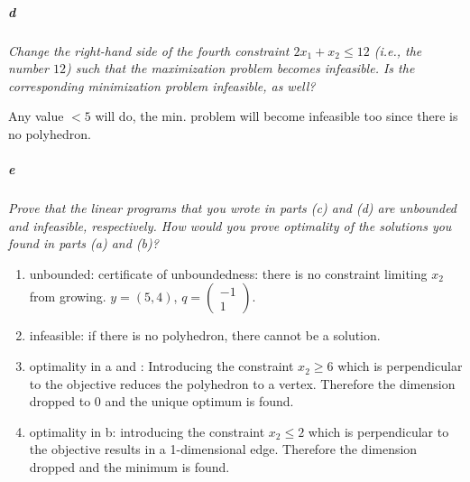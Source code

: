 \documentclass[12pt, a4]{article}
\begin{document}
\subparagraph{d}\label{pg:d} \textit{Change the right-hand side of the fourth constraint $2x_1 + x_2 \leq 12$ (i.e., the number $12$) such
that the maximization problem becomes infeasible. Is the corresponding minimization problem
infeasible, as well?}

Any value $< 5$ will do, the min. problem will become infeasible too since there is no polyhedron.
\begin{figure}[ht]
	\centering
\end{figure}
\subparagraph{e} \textit{Prove that the linear programs that you wrote in parts (c) and (d) are unbounded and infeasible,
respectively. How would you prove optimality of the solutions you found in parts (a) and (b)?}

\begin{enumerate}
	\item unbounded: certificate of unboundedness: there is no constraint limiting $x_2$ from growing. $y = (5,4)$, $q = \begin{pmatrix}
		-1\\ 
		1
	\end{pmatrix}$.
	\item infeasible: if there is no polyhedron, there cannot be a solution.
	\item optimality in a and : Introducing the constraint $x_2 \geq 6$  which is perpendicular to the objective reduces the polyhedron to a vertex. Therefore the dimension dropped to 0 and the unique optimum is found.
	\item optimality in b: introducing the constraint $x_2 \leq 2$ which is perpendicular to the objective results in a 1-dimensional edge. Therefore the dimension dropped and the minimum is found.		
\end{enumerate}
\end{document}
